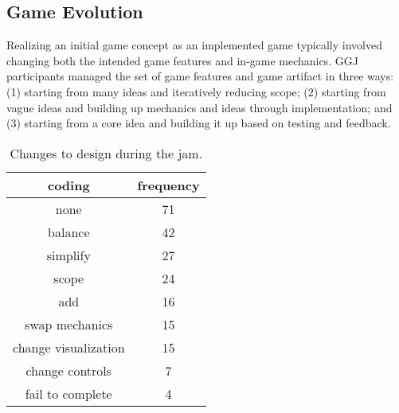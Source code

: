 \documentclass{sig-alternate}
\begin{document}

\subsection{Game Evolution}
Realizing an initial game concept as an implemented game typically involved changing both the intended game features and in-game mechanics. 
GGJ participants managed the set of game features and game artifact in three ways:
(1) starting from many ideas and iteratively reducing scope;
(2) starting from vague ideas and building up mechanics and ideas through implementation;
and
(3) starting from a core idea and building it up based on testing and feedback.

\begin{table}[b]
\centering
\scriptsize
\begin{tabular}{|c|c|}
\hline coding & frequency \\ 
\hline none & 71 \\ 
\hline balance & 42 \\ 
\hline simplify & 27 \\ 
\hline scope & 24 \\ 
\hline add & 16 \\ 
\hline swap mechanics & 15 \\ 
\hline change visualization & 15 \\ 
\hline change controls & 7 \\ 
\hline fail to complete & 4 \\ 
\hline 
\end{tabular} 
\caption{Changes to design during the jam.}
\label{tab:sys_changes}
\end{table}
\end{document}
